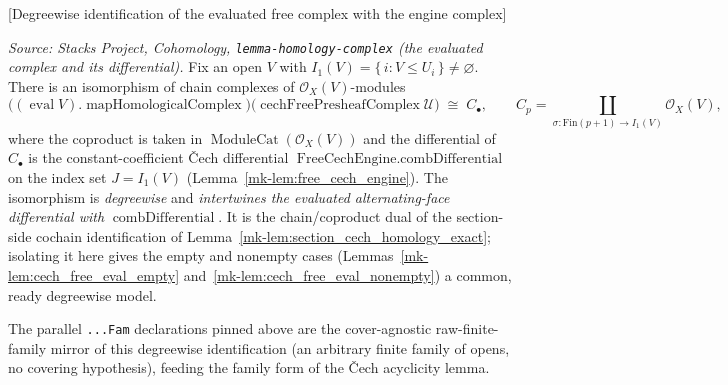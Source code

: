 \begin{lemma}

[Degreewise identification of the evaluated free complex with the engine complex]
  \label{mk-lem:cech_free_eval_engine_iso}

  \textit{Source: Stacks Project, Cohomology, \texttt{lemma-homology-complex}
  (the evaluated complex and its differential).}
  Fix an open \(V\) with \(I_1(V) = \{\, i : V \leq U_i \,\} \neq \varnothing\). There
  is an isomorphism of chain complexes of \(\mathcal{O}_X(V)\)-modules
  \[
    \bigl((\operatorname{eval} V).\operatorname{mapHomologicalComplex}\bigr)
      \bigl(\operatorname{cechFreePresheafComplex} \mathcal{U}\bigr)
    \;\cong\;
    C_\bullet,
    \qquad
    C_p = \coprod_{\sigma : \mathrm{Fin}(p+1) \to I_1(V)} \mathcal{O}_X(V),
  \]
  where the coproduct is taken in \(\operatorname{ModuleCat}(\mathcal{O}_X(V))\) and the
  differential of \(C_\bullet\) is the constant-coefficient {\v C}ech differential
  \(\operatorname{FreeCechEngine.combDifferential}\) on the index set \(J = I_1(V)\)
  (Lemma~\ref{mk-lem:free_cech_engine}). The isomorphism is \emph{degreewise} and
  \emph{intertwines the evaluated alternating-face differential with}
  \(\operatorname{combDifferential}\). It is the chain/coproduct dual of the section-side
  cochain identification of Lemma~\ref{mk-lem:section_cech_homology_exact}; isolating it
  here gives the empty and nonempty cases (Lemmas~\ref{mk-lem:cech_free_eval_empty}
  and~\ref{mk-lem:cech_free_eval_nonempty}) a common, ready degreewise model.

  The parallel \texttt{...Fam} declarations pinned above are the cover-agnostic
  raw-finite-family mirror of this degreewise identification (an arbitrary finite
  family of opens, no covering hypothesis), feeding the family form of the {\v C}ech
  acyclicity lemma.
\end{lemma}


